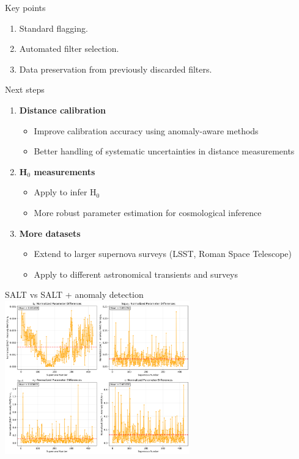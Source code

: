 \documentclass[aspectratio=169]{beamer}
\begin{document}
\begin{frame}{Key points}
  \begin{enumerate}
    \item Standard flagging.
    \item Automated filter selection.
    \item Data preservation from previously discarded filters.
  \end{enumerate}
\end{frame}

\begin{frame}{Next steps}
  \begin{enumerate}
    \item \textbf{Distance calibration}
      \begin{itemize}
        \item Improve calibration accuracy using anomaly-aware methods
        \item Better handling of systematic uncertainties in distance measurements
      \end{itemize}
    \item \textbf{H$_0$ measurements}
      \begin{itemize}
        \item Apply to infer H$_0$ 
        \item More robust parameter estimation for cosmological inference
      \end{itemize}
    \item \textbf{More datasets}
      \begin{itemize}
        \item Extend to larger supernova surveys (LSST, Roman Space Telescope)
        \item Apply to different astronomical transients and surveys
      \end{itemize}
  \end{enumerate}
\end{frame}

\begin{frame}{SALT vs SALT + anomaly detection}
  \centering
  \includegraphics[width=0.6\textwidth]{images/salt_vs_anomaly_map_comparison_Ia_all.png}
\end{frame}
\end{document}
